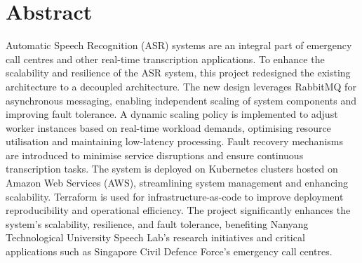 \chapter*{Abstract}

Automatic Speech Recognition (ASR) systems are an integral part of emergency call centres and other real-time transcription applications. To enhance the scalability and resilience of the ASR system, this project redesigned the existing architecture to a decoupled architecture. The new design leverages RabbitMQ for asynchronous messaging, enabling independent scaling of system components and improving fault tolerance. A dynamic scaling policy is implemented to adjust worker instances based on real-time workload demands, optimising resource utilisation and maintaining low-latency processing. Fault recovery mechanisms are introduced to minimise service disruptions and ensure continuous transcription tasks. The system is deployed on Kubernetes clusters hosted on Amazon Web Services (AWS), streamlining system management and enhancing scalability. Terraform is used for infrastructure-as-code to improve deployment reproducibility and operational efficiency. The project significantly enhances the system's scalability, resilience, and fault tolerance, benefiting Nanyang Technological University Speech Lab's research initiatives and critical applications such as Singapore Civil Defence Force's emergency call centres.
